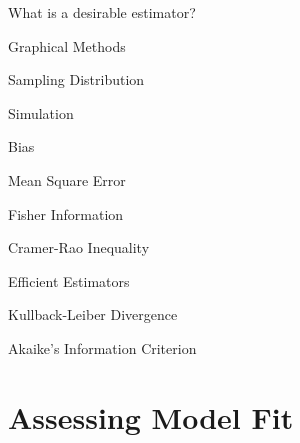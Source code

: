 \documentclass[11pt,a4paper]{article}
\begin{document}
\begin{remark}{What is a desirable estimator?}

\end{remark}

\begin{remark}{Graphical Methods}

\end{remark}

\begin{definition}{Sampling Distribution}

\end{definition}

\begin{definition}{Simulation}

\end{definition}

\begin{definition}{Bias}
\end{definition}

\begin{definition}{Mean Square Error}

\end{definition}

\begin{definition}{Fisher Information}
\end{definition}

\begin{theorem}{Cramer-Rao Inequality}

\end{theorem}

\begin{definition}{Efficient Estimators}
\end{definition}

\begin{definition}{Kullback-Leiber Divergence}

\end{definition}

\begin{definition}{Akaike's Information Criterion}

\end{definition}

\section{Assessing Model Fit}
\end{document}
